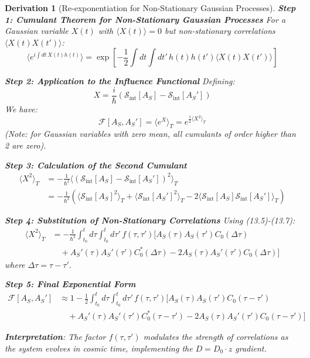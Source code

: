 \documentclass[10pt, a4paper]{article}
\newtheorem{derivation}{Derivation}
\begin{document}
\begin{derivation}[Re-exponentiation for Non-Stationary Gaussian Processes]
\textbf{Step 1: Cumulant Theorem for Non-Stationary Gaussian Processes}
For a Gaussian variable $X(t)$ with $\langle X(t) \rangle = 0$ but non-stationary correlations $\langle X(t)X(t') \rangle$:
\begin{equation}
\langle e^{i\int dt \, X(t)h(t)} \rangle = \exp\left[ -\frac{1}{2} \int dt \int dt' \, h(t)h(t') \langle X(t)X(t') \rangle \right]
\tag{14.1}
\end{equation}

\textbf{Step 2: Application to the Influence Functional}
Defining:
\begin{equation}
X = \frac{i}{\hbar} (\mathcal{S}_{\text{int}}[A_S] - \mathcal{S}_{\text{int}}[A_S'])
\tag{14.2}
\end{equation}
We have:
\begin{equation}
\mathcal{F}[A_S, A_S'] = \langle e^{X} \rangle_T = e^{\frac{1}{2}\langle X^2 \rangle_T}
\tag{14.3}
\end{equation}
(Note: for Gaussian variables with zero mean, all cumulants of order higher than 2 are zero).

\textbf{Step 3: Calculation of the Second Cumulant}
\begin{align}
\langle X^2 \rangle_T &= -\frac{1}{\hbar^2} \langle (\mathcal{S}_{\text{int}}[A_S] - \mathcal{S}_{\text{int}}[A_S'])^2 \rangle_T \\
&= -\frac{1}{\hbar^2} \left( \langle \mathcal{S}_{\text{int}}[A_S]^2 \rangle_T + \langle \mathcal{S}_{\text{int}}[A_S']^2 \rangle_T - 2\langle \mathcal{S}_{\text{int}}[A_S] \mathcal{S}_{\text{int}}[A_S'] \rangle_T \right)
\tag{14.4}
\end{align}

\textbf{Step 4: Substitution of Non-Stationary Correlations}
Using (13.5)-(13.7):
\begin{align}
\langle X^2 \rangle_T &= -\frac{1}{\hbar^2} \int_{t_0}^{t} d\tau \int_{t_0}^{t} d\tau' \, f(\tau, \tau') \big[ A_S(\tau) A_S(\tau') C_0(\Delta\tau) \\
&\quad + A_S'(\tau) A_S'(\tau') C_0^*(\Delta\tau) - 2 A_S(\tau) A_S'(\tau') C_0(\Delta\tau) \big]
\tag{14.5}
\end{align}
where $\Delta\tau = \tau - \tau'$.

\textbf{Step 5: Final Exponential Form}
\begin{align}
\mathcal{F}[A_S, A_S'] &\approx 1 - \frac{1}{2} \int_{t_0}^{t} d\tau \int_{t_0}^{t} d\tau' \, f(\tau, \tau') \big[ A_S(\tau) A_S(\tau') C_0(\tau - \tau') \nonumber \\
&\quad + A_S'(\tau) A_S'(\tau') C_0^*(\tau - \tau') - 2 A_S(\tau) A_S'(\tau') C_0(\tau - \tau') \big]
\tag{13.11}
\end{align}

\textbf{Interpretation}: The factor $f(\tau, \tau')$ modulates the strength of correlations as the system evolves in cosmic time, implementing the $D = D_0 \cdot z$ gradient.
\end{derivation}
\end{document}
